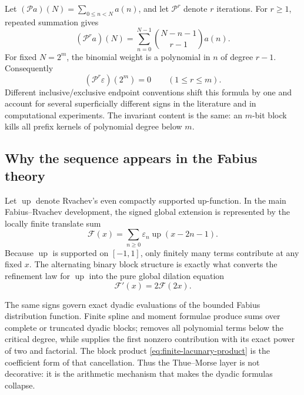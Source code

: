 \documentclass[11pt,oneside]{article}
\theoremstyle{definition}
\theoremstyle{remark}
\newcommand{\eps}{\varepsilon}
\newcommand{\Up}{\operatorname{up}}
\begin{document}
Let \((\mathcal Pa)(N)=\sum_{0\le n<N}a(n)\), and let \(\mathcal P^r\) denote \(r\)
iterations.  For \(r\ge1\), repeated summation gives
\begin{equation}
  (\mathcal P^ra)(N)
   =\sum_{n=0}^{N-1}\binom{N-n-1}{r-1}a(n).                 \label{eq:iterated-prefix-binomial}
\end{equation}
For fixed \(N=2^m\), the binomial weight is a polynomial in \(n\) of degree \(r-1\).
Consequently
\begin{equation}
  (\mathcal P^r\eps)(2^m)=0
  \qquad(1\le r\le m).                                    \label{eq:iterated-prefix-dyadic-zero}
\end{equation}
Different inclusive/exclusive endpoint conventions shift this formula by one and account for
several superficially different signs in the literature and in computational experiments.
The invariant content is the same: an \(m\)-bit block kills all prefix kernels of polynomial
degree below \(m\).

\subsection{Why the sequence appears in the Fabius theory}

Let \(\Up\) denote Rvachev's even compactly supported up-function.  In the main
Fabius--Rvachev development, the signed global extension is represented by the locally
finite translate sum
\begin{equation}
  \boxed{
  \mathcal F(x)=\sum_{n\ge0}\eps_n\Up(x-2n-1).}            \label{eq:Fabius-global-extension}
\end{equation}
Because \(\Up\) is supported on \([-1,1]\), only finitely many terms contribute at any fixed
\(x\).  The alternating binary block structure is exactly what converts the refinement law
for \(\Up\) into the pure global dilation equation
\begin{equation}
  \mathcal F'(x)=2\mathcal F(2x).                           \label{eq:Fabius-global-dilation}
\end{equation}

The same signs govern exact dyadic evaluations of the bounded Fabius distribution function.
Finite spline and moment formulae produce sums over complete or truncated dyadic blocks;
 removes all polynomial terms below the critical degree, while
 supplies the first nonzero contribution with its exact
power of two and factorial.  The block product \eqref{eq:finite-lacunary-product} is the
coefficient form of that cancellation.  Thus the Thue--Morse layer is not decorative: it is
the arithmetic mechanism that makes the dyadic formulas collapse.
\end{document}

